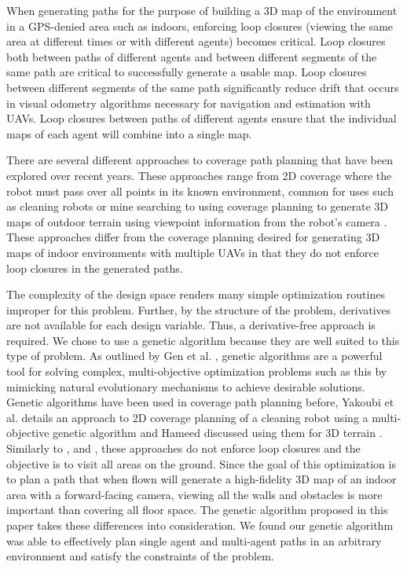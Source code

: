 \documentclass[letterpaper, 10 pt, conference]{ieeeconf}  %
\begin{document}
When generating paths for the purpose of building a 3D map of the environment in a GPS-denied area such as indoors, enforcing loop closures (viewing the same area at different times or with different agents) becomes critical. Loop closures both between paths of different agents and between different segments of the same path are critical to successfully generate a usable map. Loop closures between different segments of the same path significantly reduce drift that occurs in visual odometry algorithms necessary for navigation and estimation with UAVs. Loop closures between paths of different agents ensure that the individual maps of each agent will combine into a single map.

There are several different approaches to coverage path planning that have been explored over recent years. These approaches range from 2D coverage where the robot must pass over all points in its known environment, common for uses such as cleaning robots or mine searching \cite{Choset2001} to using coverage planning to generate 3D maps of outdoor terrain using viewpoint information from the robot's camera \cite{Bircher2016}. These approaches differ from the coverage planning desired for generating 3D maps of indoor environments with multiple UAVs in that they do not enforce loop closures in the generated paths.

The complexity of the design space renders many simple optimization routines improper for this problem. Further, by the structure of the problem, derivatives are not available for each design variable. Thus, a derivative-free approach is required. We chose to use a genetic algorithm because they are well suited to this type of problem. As outlined by Gen et al. \cite{Gen2000}, genetic algorithms are a powerful tool for solving complex, multi-objective optimization problems such as this by mimicking natural evolutionary mechanisms to achieve desirable solutions. Genetic algorithms have been used in coverage path planning before, Yakoubi et al. details an approach to 2D coverage planning of a cleaning robot using a multi-objective genetic algorithm \cite{Yakoubi2016} and Hameed discussed using them for 3D terrain \cite{Hameed2014}. Similarly to \cite{Choset2001}, and \cite{Bircher2016}, these approaches do not enforce loop closures and the objective is to visit all areas on the ground. Since the goal of this optimization is to plan a path that when flown will generate a high-fidelity 3D map of an indoor area with a forward-facing camera, viewing all the walls and obstacles is more important than covering all floor space. The genetic algorithm proposed in this paper takes these differences into consideration. We found our genetic algorithm was able to effectively plan single agent and multi-agent paths in an arbitrary environment and satisfy the constraints of the problem.
\end{document}

